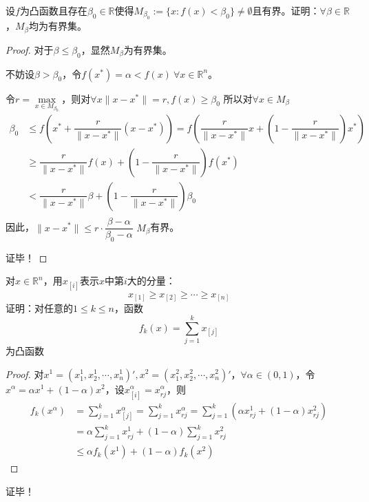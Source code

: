 \begin{problemset}
    \item 设$f$为凸函数且存在$\beta_0\in \mathbb{R}$使得$M_{\beta_0}:=\{x:f(x)<\beta_0\}\neq \emptyset$且有界。证明：$\forall \beta \in \mathbb{R}$，$M_{\beta}$均为有界集。
    \begin{proof}
        对于$\beta\leq \beta_0$，显然$M_{\beta}$为有界集。

        不妨设$\beta>\beta_0$，令$f(x^*) = \alpha <f(x)\ \forall x\in\mathbb{R}^n$。

        令$r = \max\limits_{x\in M_{\beta_0}}$，则对$\forall x\|x-x^*\| = r,f(x)\geq \beta_0$
        所以对$\forall x\in M_{\beta}$
        \[
            \begin{array}{ll}
                \beta_0&\leq f(x^* + \dfrac{r}{\|x-x^*\|}(x-x^*)) = f(\dfrac{r}{\|x-x^*\|}x + (1-\dfrac{r}{\|x-x^*\|})x^*)\\
                &\geq \dfrac{r}{\|x-x^*\|}f(x) + (1-\dfrac{r}{\|x-x^*\|})f(x^*)\\
                &<\dfrac{r}{\|x-x^*\|}\beta + (1-\dfrac{r}{\|x-x^*\|})\beta_0\\
            \end{array}
        \]
        因此，$\|x-x^*\|\leq r\cdot \dfrac{\beta-\alpha}{\beta_0-\alpha}$
        $M_{\beta}$有界。

        证毕！
    \end{proof}
    \item 对$x\in\mathbb{R}^n$，用$x_{[i]}$表示$x$中第$i$大的分量：
    \[
        x_{[1]}\geq x_{[2]}\geq \cdots \geq x_{[n]}
    \]
    证明：对任意的$1\leq k\leq n$，函数
    \[
        f_k(x) = \sum\limits_{j = 1}^{k}x_{[j]}
    \]
    为凸函数
    \begin{proof}
        对$x^1 = (x_1^1,x_2^1,\cdots, x_n^1)', x^2 = (x_1^2,x_2^2,\cdots, x_n^2)'$，$\forall \alpha \in (0,1)$，令$x^{\alpha} = \alpha x^1 + (1-\alpha)x^2$，设$x_{[i]}^{\alpha} = x_{rj}^{\alpha}$，则
        \[
            \begin{array}{ll}
                f_{k}(x^{\alpha})&=\sum\limits_{j = 1}^{k}x_{[j]}^{\alpha} = \sum\limits_{j = 1}^{k}x_{rj}^{\alpha} = \sum\limits_{j = 1}^{k}(\alpha x_{rj}^{1} + (1-\alpha)x_{rj}^{2})\\
                &=\alpha\sum\limits_{j = 1}^{k}x_{rj}^{1} + (1-\alpha)\sum\limits_{j = 1}^{k}x_{rj}^{2}\\
                &\leq \alpha f_{k}(x^1) + (1-\alpha) f_{k}(x^2) 
            \end{array}
        \]
    \end{proof}
    证毕！
\end{problemset}
